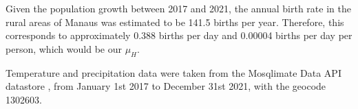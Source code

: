 \documentclass[a4paper,fleqn]{cas-dc}
\begin{document}




Given the population growth between 2017 and 2021, the annual birth rate in the rural areas of Manaus was 
estimated to be 141.5 births per year. Therefore, this corresponds 
to approximately 0.388 births per day and 0.00004 births per day 
per person, which would be our $\mu_H$. 

Temperature and precipitation data were taken from the Mosqlimate Data API datastore \cite{MosqlimateAPI}, from January 1st 2017 to December 31st 2021, with the geocode 1302603.
\end{document}
